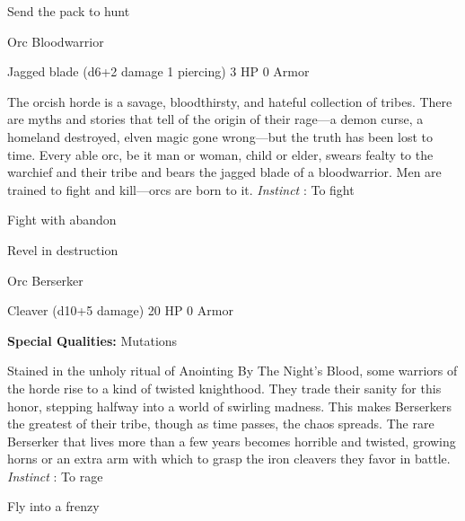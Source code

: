  
\item Send the pack to hunt


\stopitemize
 
\startMonsterName
Orc Bloodwarrior	 
\stopMonsterName
 

Jagged blade (d6+2 damage 1 piercing)	3 HP	0 Armor

 


 
\startMonsterDescription
The orcish horde is a savage, bloodthirsty, and hateful collection of tribes. There are myths and stories that tell of the origin of their rage—a demon curse, a homeland destroyed, elven magic gone wrong—but the truth has been lost to time. Every able orc, be it man or woman, child or elder, swears fealty to the warchief and their tribe and bears the jagged blade of a bloodwarrior. Men are trained to fight and kill—orcs are born to it. {\em Instinct} : To fight
\stopMonsterDescription
 
\startitemize[1,packed]

\item Fight with abandon

 
\item Revel in destruction


\stopitemize
 
\startMonsterName
Orc Berserker	 
\stopMonsterName
 

Cleaver (d10+5 damage)	20 HP	0 Armor

 


 
\startMonsterQualities
{\bf Special Qualities:}  Mutations
\stopMonsterQualities
 
\startMonsterDescription
Stained in the unholy ritual of Anointing By The Night’s Blood, some warriors of the horde rise to a kind of twisted knighthood. They trade their sanity for this honor, stepping halfway into a world of swirling madness. This makes Berserkers the greatest of their tribe, though as time passes, the chaos spreads. The rare Berserker that lives more than a few years becomes horrible and twisted, growing horns or an extra arm with which to grasp the iron cleavers they favor in battle. {\em Instinct} : To rage
\stopMonsterDescription
 
\startitemize[1,packed]

\item Fly into a frenzy

